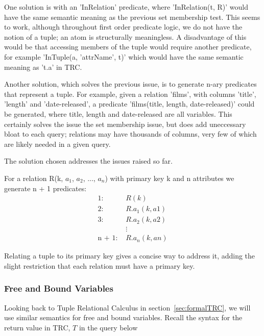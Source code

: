 \documentclass[a4paper, 11pt]{article}
\begin{document}
      One solution is with an 'InRelation' predicate, where 'InRelation(t, R)'
      would have the same semantic meaning as the previous set membership test.
      This seems to work, although throughout first order predicate logic, we
      do not have the notion of a tuple; an atom is structurally meaningless. A
      disadvantage of this would be that accessing members of the tuple would
      require another predicate, for example 'InTuple(a, 'attrName', t)' which
      would have the same semantic meaning as 't.a' in TRC.

      Another solution, which solves the previous issue, is to generate n-ary
      predicates that represent a tuple. For example, given a relation 'films',
      with columns 'title', 'length' and 'date-released', a predicate
      'films(title, length, date-released)' could be generated, where title,
      length and date-released are all variables. This certainly solves the
      issue the set membership issue, but does add uneccessary bloat to each
      query; relations may have thousands of columns, very few of which are
      likely needed in a given query.

      The solution chosen addresses the issues raised so far.

      For a relation R(k, $a_{1}$, $a_{2}$, ..., $a_{n}$) with primary key k
      and n attributes we generate n + 1 predicates:
      \begin{align*}
        \text{1:  }     & R(k)            \\
        \text{2:  }     & R.a_1(k, a1)   \\
        \text{3:  }     & R.a_2(k, a2)   \\
                        & \vdots          \\
        \text{n + 1:  }  & R.a_n(k, an)
      \end{align*}

      Relating a tuple to its primary key gives a concise way to address it,
      adding the slight restriction that each relation must have a primary key.

    \subsubsection{Free and Bound Variables}
    \label{sec:freebound}

      Looking back to Tuple Relational Calculus in
      section~\ref{sec:formalTRC}, we will use similar semantics for free and
      bound variables. Recall the syntax for the return value in TRC, $T$ in the
      query below
\end{document}
